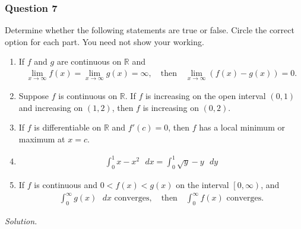 \documentclass[12pt]{article}
\begin{document}
\subsubsection*{Question 7}
Determine whether the following statements are true or false. Circle the correct option for each part. You need not show your working.
\begin{enumerate}[label=\textbf{(\alph*)}]
    \itemsep 0em
    \item If $f$ and $g$ are continuous on $\mathbb{R}$ and \begin{align*}
        \lim_{x\rightarrow\infty}f\left(x\right)=\lim_{x\rightarrow\infty}g\left(x\right)=\infty,\quad\text{then}\quad \lim_{x\rightarrow\infty}\left(f\left(x\right)-g\left(x\right)\right)=0.
    \end{align*}
    \item Suppose $f$ is continuous on $\mathbb{R}$. If $f$ is increasing on the open interval $\left(0,1\right)$ and increasing on $\left(1,2\right)$, then $f$ is increasing on $\left(0,2\right)$.
    \item If $f$ is differentiable on $\mathbb{R}$ and $f'\left(c\right)=0$, then $f$ has a local minimum or maximum at $x=c$.
    \item \begin{align*}
        \int_{0}^{1}x-x^2\text{ }dx=\int_{0}^{1}\sqrt{y}-y\text{ }dy
    \end{align*}
    \item If $f$ is continuous and $0<f\left(x\right)<g\left(x\right)$ on the interval $\left[0,\infty\right)$, and \begin{align*}
        \int_{0}^{\infty}g\left(x\right)\text{ }dx\text{ converges},\quad\text{then}\quad \int_{0}^{\infty}f\left(x\right)\text{ converges.}
    \end{align*}
\end{enumerate}
\textit{Solution.}
\end{document}
